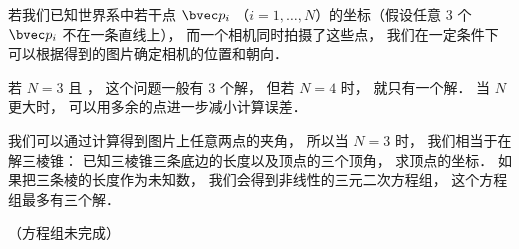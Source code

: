 

若我们已知世界系中若干点 $\bvec p_i$ （$i = 1, \dots, N$）的坐标（假设任意 3 个 $\bvec p_i$ 不在一条直线上）， 而一个相机同时拍摄了这些点， 我们在一定条件下可以根据得到的图片确定相机的位置和朝向．

若 $N = 3$ 且 ， 这个问题一般有 3 个解， 但若 $N = 4$ 时， 就只有一个解． 当 $N$ 更大时， 可以用多余的点进一步减小计算误差．

我们可以通过计算得到图片上任意两点的夹角， 所以当 $N = 3$ 时， 我们相当于在解三棱锥： 已知三棱锥三条底边的长度以及顶点的三个顶角， 求顶点的坐标． 如果把三条棱的长度作为未知数， 我们会得到非线性的三元二次方程组， 这个方程组最多有三个解．

（方程组未完成）

